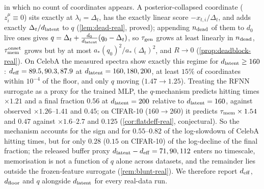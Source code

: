 in which no count of coordinates appears. A posterior-collapsed coordinate ($z^\mu_i\equiv0$) sits exactly at $\lambda_i=\Delta_t$, has the exactly linear score $-x_{t,i}/\Delta_t$, and adds exactly $\Delta_t/d_{\mathrm{latent}}$ to $q$ (\cref{lem:dead-real}, proved); appending $n_{\rm dead}$ of them to $d_0$ live ones gives $q=\Delta_t+\tfrac{d_0}{d_{\mathrm{latent}}}(q_0-\Delta_t)$, so $\tau_{\mathrm{gen}}$ grows at least linearly in $n_{\rm dead}$, $\tau_{\mathrm{mem}}^{\rm onset}$ grows but by at most $a_*(q_0)^2/a_*(\Delta_t)^2$, and $R\to0$ (\cref{prop:deadblock-real}). On CelebA the measured spectra show exactly this regime for $d_{\mathrm{latent}}\ge160$: $d_{\rm eff}=89.5,90.3,87.9$ at $d_{\mathrm{latent}}=160,180,200$, at least $15\%$ of coordinates within $10^{-4}$ of the floor, and only $q$ moving ($1.47\to1.25$). Treating the RFNN surrogate as a proxy for the trained MLP, the $q$-mechanism predicts hitting times $\times1.21$ and a final fraction $0.56$ at $d_{\mathrm{latent}}=200$ relative to $d_{\mathrm{latent}}=160$, against observed $\times1.26$--$1.41$ and $0.45$; on CIFAR-10 ($160\to260$) it predicts $\tau_{\mathrm{mem}}\times1.54$ and $0.47$ against $\times1.6$--$2.7$ and $0.125$ (\cref{cor:flatdeff-real}, conjectural). So the mechanism accounts for the sign and for $0.55$--$0.82$ of the log-slowdown of CelebA hitting times, but for only $0.28$ ($0.15$ on CIFAR-10) of the log-decline of the final fraction; the released buffer proxy $d_{\mathrm{latent}}-d_{\rm eff}=71,90,112$ enters no timescale, memorisation is not a function of $q$ alone across datasets, and the remainder lies outside the frozen-feature surrogate (\cref{rem:blunt-real}). We therefore report $d_{\rm eff}$, $d_{\rm floor}$ and $q$ alongside $d_{\mathrm{latent}}$ for every real-data run.

